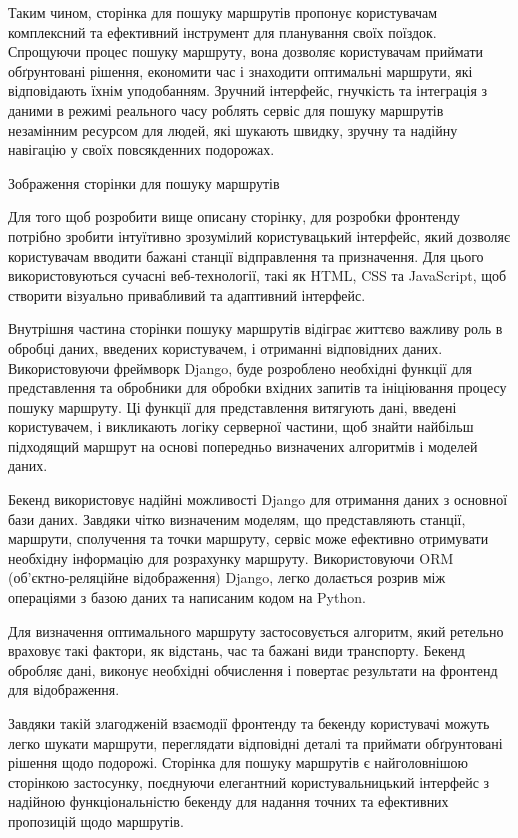 Таким чином, сторінка для пошуку маршрутів пропонує користувачам комплексний та ефективний інструмент для планування своїх поїздок. Спрощуючи процес пошуку маршруту, вона дозволяє користувачам приймати обґрунтовані рішення, економити час і знаходити оптимальні маршрути, які відповідають їхнім уподобанням. Зручний інтерфейс, гнучкість та інтеграція з даними в режимі реального часу роблять сервіс для пошуку маршрутів незамінним ресурсом для людей, які шукають швидку, зручну та надійну навігацію у своїх повсякденних подорожах.

Зображення сторінки для пошуку маршрутів


Для того щоб розробити вище описану сторінку, для розробки фронтенду потрібно зробити інтуїтивно зрозумілий користувацький інтерфейс, який дозволяє користувачам вводити бажані станції відправлення та призначення. Для цього використовуються сучасні веб-технології, такі як HTML, CSS та JavaScript, щоб створити візуально привабливий та адаптивний інтерфейс.

Внутрішня частина сторінки пошуку маршрутів відіграє життєво важливу роль в обробці даних, введених користувачем, і отриманні відповідних даних. Використовуючи фреймворк Django, буде розроблено необхідні функції для представлення та обробники для обробки вхідних запитів та ініціювання процесу пошуку маршруту. Ці функції для представлення витягують дані, введені користувачем, і викликають логіку серверної частини, щоб знайти найбільш підходящий маршрут на основі попередньо визначених алгоритмів і моделей даних.

Бекенд використовує надійні можливості Django для отримання даних з основної бази даних. Завдяки чітко визначеним моделям, що представляють станції, маршрути, сполучення та точки маршруту, сервіс може ефективно отримувати необхідну інформацію для розрахунку маршруту. Використовуючи ORM (об'єктно-реляційне відображення) Django, легко долається розрив між операціями з базою даних та написаним кодом на Python.

Для визначення оптимального маршруту застосовується алгоритм, який ретельно враховує такі фактори, як відстань, час та бажані види транспорту. Бекенд обробляє дані, виконує необхідні обчислення і повертає результати на фронтенд для відображення.

Завдяки такій злагодженій взаємодії фронтенду та бекенду користувачі можуть легко шукати маршрути, переглядати відповідні деталі та приймати обґрунтовані рішення щодо подорожі. Сторінка для пошуку маршрутів є найголовнішою сторінкою застосунку, поєднуючи елегантний користувальницький інтерфейс з надійною функціональністю бекенду для надання точних та ефективних пропозицій щодо маршрутів.
